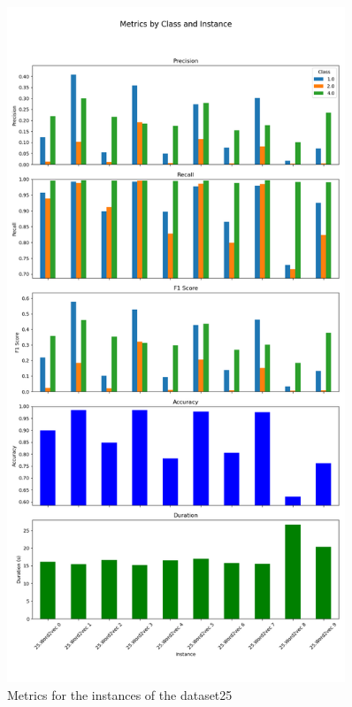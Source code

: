 \begin{figure}[h!]
\centering
\includegraphics[width=0.9\textwidth]{img/annexes/25/25 - Metrics.png}
\caption{Metrics for the instances of the dataset25}
\label{fig:25_metrics_instance}
\end{figure}

